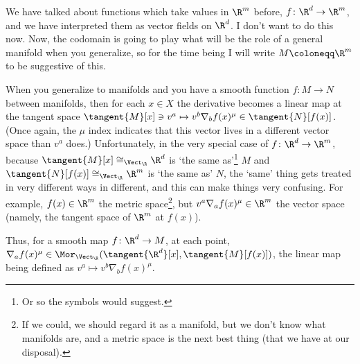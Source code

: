 We have talked about functions which take values in $\R ^m$ before, $f\colon \R ^d\rightarrow \R ^m$, and we have interpreted them as vector fields on $\R ^d$.  I don't want to do this now.  Now, the codomain is going to play what will be the role of a general manifold when you generalize, so for the time being I will write $M\coloneqq \R ^m$ to be suggestive of this.
\begin{displayquote}
When you generalize to manifolds and you have a smooth function $f\colon M\rightarrow N$ between manifolds, then for each $x\in X$ the derivative becomes a linear map at the tangent space $\tangent{M}[x]\ni v^a\mapsto v^b\nabla _bf(x)^\mu \in \tangent{N}[f(x)]$.  (Once again, the $\mu$ index indicates that this vector lives in a different vector space than $v^a$ does.)  Unfortunately, in the very special case of $f\colon \R ^d\rightarrow \R ^m$, because $\tangent{M}[x]\cong _{\Vect _{\R}}\R ^d$ is `the same as'\footnote{Or so the symbols would suggest.} $M$ and $\tangent{N}[f(x)]\cong _{\Vect _{\R}}\R ^m$ is `the same as' $N$, the `same' thing gets treated in very different ways in different, and this can make things very confusing.  For example, $f(x)\in \R ^m$ the metric space\footnote{If we could, we should regard it as a manifold, but we don't know what manifolds are, and a metric space is the next best thing (that we have at our disposal).}, but $v^a\nabla _af(x)^\mu \in \R ^m$ the vector space (namely, the tangent space of $\R ^m$ at $f(x)$).
\end{displayquote}
Thus, for a smooth map $f\colon \R ^d\rightarrow M$, at each point, $\nabla _af(x)^\mu \in \Mor _{\Vect _{\R}}(\tangent{\R ^d}[x],\tangent{M}[f(x)])$, the linear map being defined as $v^a\mapsto v^b\nabla _bf(x)^\mu$.

